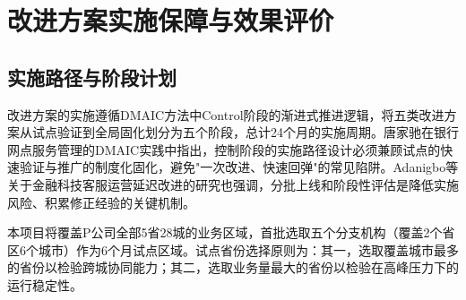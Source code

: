 \chapter{改进方案实施保障与效果评价}

\section{实施路径与阶段计划}

改进方案的实施遵循DMAIC方法中Control阶段的渐进式推进逻辑，将五类改进方案从试点验证到全局固化划分为五个阶段，总计24个月的实施周期\cite{ref12}。唐家驰在银行网点服务管理的DMAIC实践中指出，控制阶段的实施路径设计必须兼顾试点的快速验证与推广的制度化固化，避免"一次改进、快速回弹"的常见陷阱\cite{ref51}。Adanigbo等关于金融科技客服运营延迟改进的研究也强调，分批上线和阶段性评估是降低实施风险、积累修正经验的关键机制\cite{ref49}。

本项目将覆盖P公司全部5省28城的业务区域，首批选取五个分支机构（覆盖2个省区6个城市）作为6个月试点区域。试点省份选择原则为：其一，选取覆盖城市最多的省份以检验跨城协同能力；其二，选取业务量最大的省份以检验在高峰压力下的运行稳定性。

